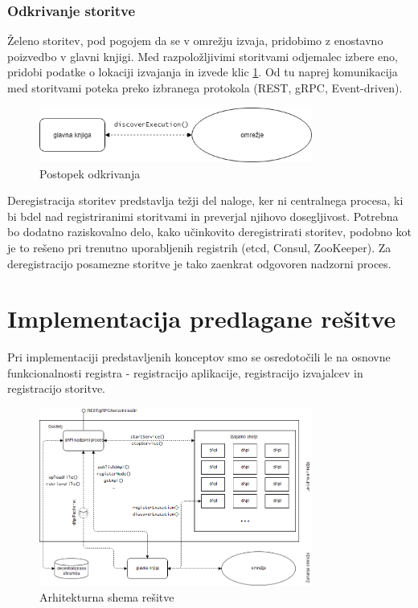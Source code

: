 \documentclass[a4paper, 12pt]{book}
\begin{document}
\subsection{Odkrivanje storitve}
\label{serviceDiscovery}
Želeno storitev, pod pogojem da se v omrežju izvaja, pridobimo z enostavno poizvedbo v glavni knjigi.
Med razpoložljivimi storitvami odjemalec izbere eno, pridobi podatke o lokaciji izvajanja in izvede klic \ref{discover_service}.
Od tu naprej komunikacija med storitvami poteka preko izbranega protokola (REST, gRPC, Event-driven).

\begin{figure}[h]
	\centering
	\includegraphics[width=0.8\textwidth]{slike/discover_service.png}
	\caption{Postopek odkrivanja}
	\label{discover_service}
\end{figure}

Deregistracija storitev predstavlja težji del naloge, ker ni centralnega procesa, ki bi bdel nad registriranimi storitvami in preverjal njihovo dosegljivost.
Potrebna bo dodatno raziskovalno delo, kako učinkovito deregistrirati storitev, podobno kot je to rešeno pri trenutno uporabljenih registrih (etcd, Consul, ZooKeeper).
Za deregistracijo posamezne storitve je tako zaenkrat odgovoren nadzorni proces.

\chapter{Implementacija predlagane rešitve}
\label{ch5}

Pri implementaciji predstavljenih konceptov smo se osredotočili le na osnovne funkcionalnosti registra - registracijo aplikacije, registracijo izvajalcev in registracijo storitve.

\begin{figure}[h]
	\includegraphics[width=0.8\textwidth]{slike/dApi_sl.png}
	\caption{Arhitekturna shema rešitve}
	\label{scheme}
\end{figure}
\end{document}
